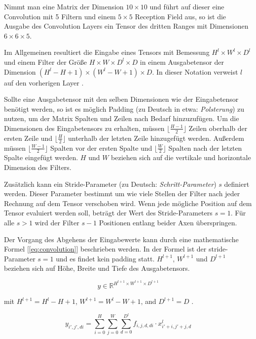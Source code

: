 Nimmt man eine Matrix der Dimension $10 \times 10$ und führt auf dieser eine Convolution mit 5 Filtern und einem $5 \times 5$ Reception Field aus, so ist die Ausgabe des Convolution Layers ein Tensor des dritten Ranges mit Dimensionen $6 \times 6 \times 5$. 

Im Allgemeinen resultiert die Eingabe eines Tensors mit Bemessung $H^l \times W^l \times D^l$ und einem Filter der Größe $H \times W \times D^l \times D$ in einem Ausgabetensor der Dimension $(H^l - H + 1) \times (W^l - W + 1) \times D$. In dieser Notation verweist $l$ auf den vorherigen Layer \parencite{Wu.2017}.

Sollte eine Ausgabetensor mit den selben Dimensionen wie der Eingabetensor benötigt werden, so ist es möglich Padding (zu Deutsch in etwa: \textit{Polsterung}) zu nutzen, um der Matrix Spalten und Zeilen nach Bedarf hinzuzufügen. Um die Dimensionen des Eingabetensors zu erhalten, müssen $\lfloor \frac{H-1}{2} \rfloor$ Zeilen oberhalb der ersten Zeile und $\lfloor \frac{H}{2} \rfloor$ unterhalb der letzten Zeile hinzugefügt werden. Außerdem müssen $\lfloor \frac{W-1}{2} \rfloor$ Spalten vor der ersten Spalte und $\lfloor \frac{W}{2} \rfloor$ Spalten nach der letzten Spalte eingefügt werden. $H$ und $W$ beziehen sich auf die vertikale und horizontale Dimension des Filters.

Zusätzlich kann ein Stride-Parameter (zu Deutsch: \textit{Schritt-Parameter}) $s$ definiert werden. Dieser Parameter bestimmt um wie viele Stellen der Filter nach jeder Rechnung auf dem Tensor verschoben wird. Wenn jede mögliche Position auf dem Tensor evaluiert werden soll, beträgt der Wert des Stride-Parameters $s=1$. Für alle $s > 1$ wird der Filter $s - 1$ Positionen entlang beider Axen überspringen.

Der Vorgang des Abgehens der Eingabewerte kann durch eine mathematische Formel [\ref{eq:convolution}] beschrieben werden. In der Formel ist der stride-Parameter $s=1$ und es findet kein padding statt. $H^{l+1}$, $W^{l+1}$ und $D^{l+1}$ beziehen sich auf Höhe, Breite und Tiefe des Ausgabetensors.
 
\begin{equation}
y \in \mathbb{R}^{H^{l+1} \times W^{l+1} \times D^{l+1}}
\end{equation}

mit $H^{l+1} = H^l - H + 1$, $W^{l+1} = W^l - W + 1$, and $D^{l+1} = D$ \parencite{Wu.2017}.


\begin{equation}
\label{eq:convolution}
y_{i',j',di} = \sum_{i=0}^{H}\sum_{j=0}^{W}\sum_{d =0}^{D^l} f_{i,j,d,di} \cdot x^{l}_{i'+i, j'+j, d}
\end{equation}


